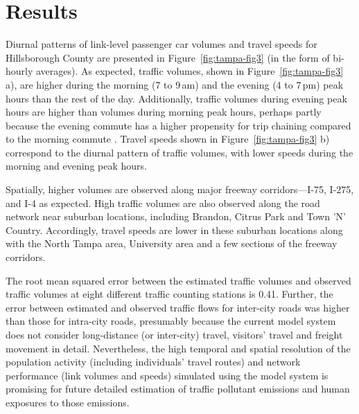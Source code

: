 \section{Results}
Diurnal patterns of link-level passenger car volumes and travel speeds for Hillsborough County are presented in Figure~\ref{fig:tampa-fig3} (in the form of bi-hourly averages). As expected, traffic volumes, shown in Figure~\ref{fig:tampa-fig3} a), are higher during the morning (7 to 9\,am) and the evening (4 to 7\,pm) peak hours than the rest of the day. Additionally, traffic volumes during evening peak hours are higher than volumes during morning peak hours, perhaps partly because the evening commute has a higher propensity for trip chaining compared to the morning commute \citep[][]{ChuYL_TRR_2003}. Travel speeds shown in Figure~\ref{fig:tampa-fig3} b) correspond to the diurnal pattern of traffic volumes, with lower speeds during the morning and evening peak hours.

Spatially, higher volumes are observed along major freeway corridors---I-75, I-275, and I-4 as expected. High traffic volumes are also observed along the road network near suburban locations, including Brandon, Citrus Park and Town 'N' Country. Accordingly, travel speeds are lower in these suburban locations along with the North Tampa area, University area and a few sections of the freeway corridors. 

The root mean squared error between the estimated traffic volumes and observed traffic volumes at eight different traffic counting stations is 0.41. Further, the error between estimated and observed traffic flows for inter-city roads was higher than those for intra-city roads, presumably because the current model system does not consider long-distance (or inter-city) travel, visitors' travel and freight movement in detail. Nevertheless, the high temporal and spatial resolution of the population activity (including individuals' travel routes) and network performance (\ie link volumes and speeds) simulated using the model system is promising for future detailed estimation of traffic pollutant emissions and human exposures to those emissions.  

